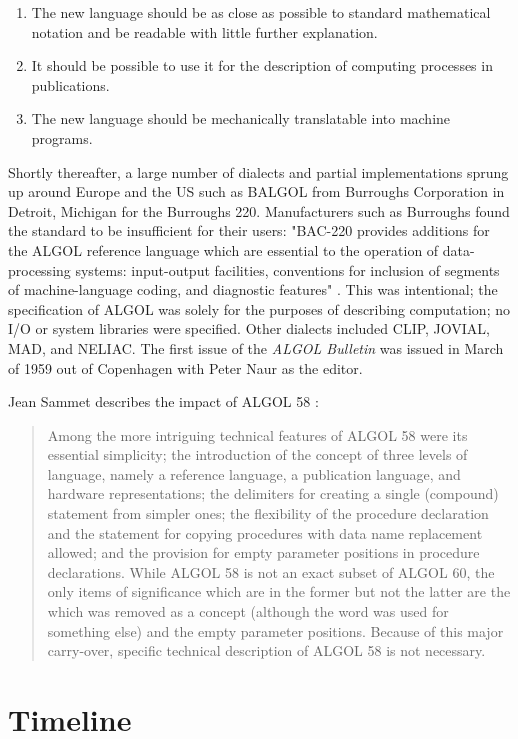 \begin{enumerate}
\item The new language should be as close as possible to standard mathematical 
      notation and be readable with little further explanation.
\item It should be possible to use it for the description of computing processes in publications.
\item The new language should be mechanically translatable into machine programs.
\end{enumerate}

Shortly thereafter, a large number of dialects and partial implementations sprung up around Europe
and the US such as BALGOL from Burroughs Corporation in Detroit, Michigan for the Burroughs 220.
Manufacturers such as Burroughs found the standard to be insufficient for their users:
"BAC-220 provides additions for the ALGOL reference language which are essential to
the operation of data-processing systems: input-output
facilities, conventions for inclusion of segments of machine-language coding,
and diagnostic features" \cite{burroughs1963bac220}.
This was intentional; the specification of ALGOL was solely for the purposes of
describing computation; no I/O or system libraries were specified.
Other dialects included CLIP, JOVIAL, MAD, and NELIAC.
The first issue of the \textit{ALGOL Bulletin} was issued in March of 1959 out of Copenhagen
with Peter Naur as the editor.

Jean Sammet describes the impact of ALGOL 58
\cite{sammet_programming_languages_history_and_fundamentals_1969}:
\begin{quotation}
Among the more intriguing technical features of ALGOL 58 were its essential 
simplicity; the introduction of the concept of three levels of language, namely 
a reference language, a publication language, and hardware representations; the 
 delimiters for creating a single (compound) statement from simpler 
ones; the flexibility of the procedure declaration and the  statement for 
copying procedures with data name replacement allowed; and the provision for 
empty parameter positions in procedure declarations. While ALGOL 58 is not an 
exact subset of ALGOL 60, the only items of significance which are in the 
former but not the latter are the  which was removed as a concept (although 
the word was used for something else) and the empty parameter positions. 
Because of this major carry-over, specific technical description of ALGOL 58 is 
not necessary. 
\end{quotation}

\pagebreak
\section{Timeline}

